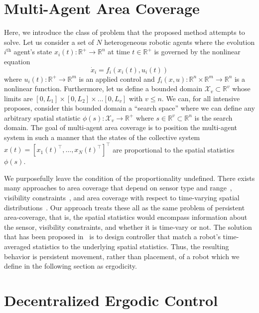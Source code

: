 \documentclass[letterpaper, 10 pt, conference]{ieeeconf}  %
\begin{document}
\section{Multi-Agent Area Coverage}
Here, we introduce the class of problem that the proposed method attempts to solve.
Let us consider a set of $N$ heterogeneous robotic agents where the evolution $i^\text{th}$ agent's state $x_i(t) : \mathbb{R}^+ \to \mathbb{R}^n$  at time $t\in \mathbb{R}^+$ is governed by the nonlinear equation
\begin{equation}
\dot{x}_i = f_i(x_i(t), u_i(t))
\end{equation}
where $u_i(t) : \mathbb{R}^+ \to \mathbb{R}^m$ is an applied control and $f_i(x,u) : \mathbb{R}^n \times \mathbb{R}^m \to \mathbb{R}^n$ is a nonlinear function.
Furthermore, let us define a bounded domain $\mathcal{X}_v \subset \mathbb{R}^v$ whose limits are $\left[ 0, L_1\right]\times \left[ 0, L_2\right] \times \ldots \left[ 0, L_v\right]$ with $v \le n$.
We can, for all intensive proposes, consider this bounded domain a ``search space'' where we can define any arbitrary spatial statistic $\phi(s) : \mathcal{X}_v \to \mathbb{R}^+$ where $s \in \mathbb{R}^v \subset \mathbb{R}^n$ is the search domain.
The goal of multi-agent area coverage is to position the multi-agent system in such a manner that the states of the collective system $x(t) = \left[x_1(t)^\top, \ldots, x_N(t)^\top \right]^\top$ are proportional to the spatial statistics $\phi(s)$.

We purposefully leave the condition of the proportionality undefined. 
There exists many approaches to area coverage that depend on sensor type and range~\cite{++}, visibility constraints~\cite{++}, and area coverage with respect to time-varying spatial distributions~\cite{++}. 
Our approach treats these all as the same problem of persistent area-coverage, that is, the spatial statistics would encompass information about the sensor, visibility constraints, and whether it is time-vary or not. 
The solution that has been proposed in~\cite{abraham2017ergodic, miller2016ergodic, mathew2011metrics,mavrommatiTRO2017realTime,miller2013trajectory} is to design controller that match a robot's time-averaged statistics to the underlying spatial statistics.
Thus, the resulting behavior is persistent movement, rather than placement, of a robot which we define in the following section as ergodicity.

\section{Decentralized Ergodic Control}
\label{sec:decentralized-ergodic-control}
\end{document}
